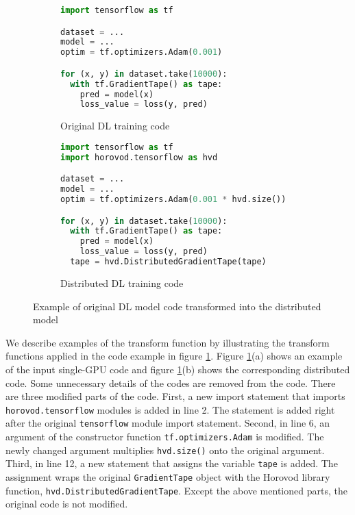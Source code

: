 \begin{figure}[ht!]
  \centering
  \begin{subfigure}[t]{0.48\textwidth}
    \begin{lstlisting}[language=Python]
import tensorflow as tf

dataset = ...
model = ...
optim = tf.optimizers.Adam(0.001) 

for (x, y) in dataset.take(10000):
  with tf.GradientTape() as tape:
    pred = model(x)
    loss_value = loss(y, pred)\end{lstlisting} 
    \caption{Original DL training code}
  \end{subfigure}
  \hspace{5mm}
  \begin{subfigure}[t]{0.48\textwidth}
    \begin{lstlisting}[language=Python]
import tensorflow as tf
import horovod.tensorflow as hvd

dataset = ...
model = ...
optim = tf.optimizers.Adam(0.001 * hvd.size()) 

for (x, y) in dataset.take(10000):
  with tf.GradientTape() as tape:
    pred = model(x)
    loss_value = loss(y, pred) 
  tape = hvd.DistributedGradientTape(tape)\end{lstlisting}
    \caption{Distributed DL training code}
  \end{subfigure}
  \caption{Example of original DL model code transformed into the distributed model}
  \label{fig:trans:ex}
\end{figure}

We describe examples of the transform function by illustrating the transform
functions applied in the code example in figure \ref{fig:trans:ex}.
Figure \ref{fig:trans:ex}(a) shows an example of the input single-GPU code and
figure \ref{fig:trans:ex}(b) shows the corresponding distributed code. 
Some unnecessary details of the codes are removed from the code.
There are three modified parts of the code. 
First, a new import statement that imports {\tt horovod.tensorflow} modules
is added in line 2. 
The statement is added right after the original {\tt tensorflow} module
import statement.
Second, in line 6, an argument of the constructor function 
{\tt tf.optimizers.Adam} is modified. The newly changed argument multiplies
{\tt hvd.size()} onto the original argument.
Third, in line 12, a new statement that assigns the variable {\tt tape}
is added. The assignment wraps the original {\tt GradientTape} object with
the Horovod library function, {\tt hvd.DistributedGradientTape}.
Except the above mentioned parts, the original code is not modified.     

